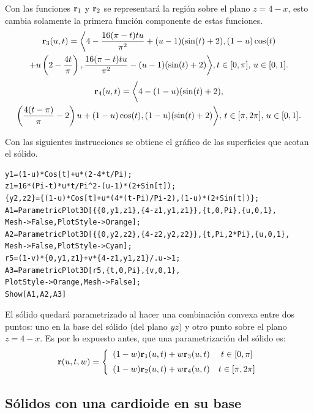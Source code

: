 Con las funciones ${\bf r}_1$ y ${\bf r}_2$ se representará la región sobre el
plano $z=4-x$, esto cambia solamente la primera función componente de estas funciones.
\begin{multline*}
{\bf r}_3(u,t)=\bigg\langle 4-\frac{16 (\pi-t) t u}{\pi ^2}+(u-1) (\sin (t)+2), (1-u)\cos (t) \\
+u\left(2-\frac{4t}{\pi}\right), \frac{16 (\pi -t) t u}{\pi ^2}-(u-1) (\sin (t)+2) \bigg\rangle, t\in[0,\pi],\, u\in[0,1].
\end{multline*}
\begin{multline*}
{\bf r}_4(u,t)= \bigg\langle 4-(1-u)(\sin(t)+2),\\
\left(\frac{4(t-\pi)}{\pi}-2\right)u+(1-u)\cos(t),
(1-u)(\sin (t)+2)\bigg\rangle,\,t\in[\pi,2\pi],\, u\in[0,1].
\end{multline*}

Con las siguientes instrucciones se obtiene el gráfico de las superficies que acotan el sólido.

\begin{tcolorbox}[title=\bf Instrucción \verb"Mathematica"]
\begin{Verbatim}[formatcom=\letraverbatim]
y1=(1-u)*Cos[t]+u*(2-4*t/Pi);
z1=16*(Pi-t)*u*t/Pi^2-(u-1)*(2+Sin[t]);
{y2,z2}={(1-u)*Cos[t]+u*(4*(t-Pi)/Pi-2),(1-u)*(2+Sin[t])};
A1=ParametricPlot3D[{{0,y1,z1},{4-z1,y1,z1}},{t,0,Pi},{u,0,1},
Mesh->False,PlotStyle->Orange];
A2=ParametricPlot3D[{{0,y2,z2},{4-z2,y2,z2}},{t,Pi,2*Pi},{u,0,1},
Mesh->False,PlotStyle->Cyan];
r5=(1-v)*{0,y1,z1}+v*{4-z1,y1,z1}/.u->1;
A3=ParametricPlot3D[r5,{t,0,Pi},{v,0,1},
PlotStyle->Orange,Mesh->False];
Show[A1,A2,A3]
\end{Verbatim}
\end{tcolorbox}

El sólido quedará parametrizado al hacer una combinación convexa entre dos puntos:
uno en la base del sólido (del plano $yz$) y otro punto sobre el plano $z=4-x$.
Es por lo expuesto antes, que una parametrización del sólido es:
\begin{equation} \label{solidohueco2}
{\bf r}(u,t,w) = \left \{
\begin{array}{cc}
(1-w){\bf r}_1(u,t)+w {\bf r}_3(u,t) & t \in [0,\pi] \\[0.2cm]
(1-w){\bf r}_2(u,t)+w {\bf r}_4(u,t) & t \in [\pi,2\pi]
\end{array}\right .
\end{equation}

\subsection{Sólidos con una cardioide en su base} 

